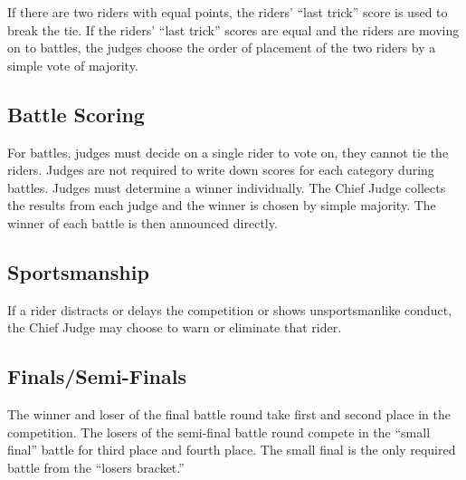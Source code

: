 If there are two riders with equal points, the riders' ``last trick'' score is used to break the tie.
If the riders' ``last trick'' scores are equal and the riders are moving on to battles, the judges choose the order of placement of the two riders by a simple vote of majority.

\subsection{Battle Scoring}
For battles, judges must decide on a single rider to vote on, they cannot tie the riders.
Judges are not required to write down scores for each category during battles.
Judges must determine a winner individually.
The Chief Judge collects the results from each judge and the winner is chosen by simple majority.
The winner of each battle is then announced directly.

\subsection{Sportsmanship}
If a rider distracts or delays the competition or shows unsportsmanlike conduct, the Chief Judge may choose to warn or eliminate that rider.

\subsection{Finals/Semi-Finals}
The winner and loser of the final battle round take first and second place in the competition.
The losers of the semi-final battle round compete in the ``small final'' battle for third place and fourth place.
The small final is the only required battle from the ``losers bracket.''
